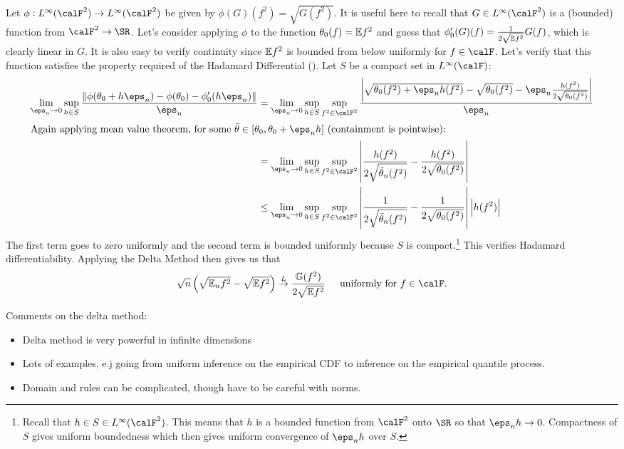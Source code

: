 \begin{example}
	Let \(\phi:L^\infty(\calF^2)\to L^\infty(\calF^2)\) be given by \(\phi(G)(f^2) = \sqrt{G(f^2)}\). It is useful here to recall that \(G \in L^\infty(\calF^2)\) is a (bounded) function from  \(\calF^2\to\SR\). Let's consider applying \(\phi\) to the function  \(\theta_0(f)=\mathbb{E} f^2\) and guess that \(\phi_0'(G)(f) = \frac{1}{2\sqrt{\mathbb{E} f^2}}G(f)\), which is clearly linear in \(G\). It is also easy to verify continuity since \(\mathbb{E} f^2\) is bounded from below uniformly for \(f\in\calF\). Let's verify that this function satisfies the property required of the Hadamard Differential (). Let \(S\) be a compact set in  \(L^\infty(\calF)\):
	\begin{align*}
		\lim_{\eps_n\to 0}\sup_{h \in S}\frac{\|\phi(\theta_0+h\eps_n)-\phi(\theta_0)-\phi_0'(h\eps_n)\|}{\eps_n} 
		&= \lim_{\eps_n\to 0}\sup_{h\in S} \sup_{f^2\in\calF^2}\frac{ \left|\sqrt{\theta_0(f^2)+\eps_nh(f^2)}-\sqrt{\theta_0(f^2)} - \eps_n\frac{h(f^2)}{2\sqrt{\theta_0(f^2)}} \right|}{\eps_n} \\
		\intertext{Again applying mean value theorem, for some \(\bar\theta \in [\theta_0, \theta_0+\eps_n h]\) (containment is pointwise):} 
		&= \lim_{\eps_n\to0}\sup_{h\in S}\sup_{f^2 \in \calF^2} \left|\frac{h(f^2)}{2\sqrt{\bar\theta_n(f^2)}} - \frac{h(f^2)}{2\sqrt{\theta_0(f^2)}}  \right| \\
		&\leq \lim_{\eps_n\to 0}\sup_{h\in S}\sup_{f^2\in\calF^2}\left|\frac{1}{2\sqrt{\bar\theta_n(f^2)}}-\frac{1}{2\sqrt{\theta_0(f^2)}}\right|\left|h(f^2)\right|
	\end{align*}
	The first term goes to zero uniformly and the second term is bounded uniformly because \(S\) is compact.\footnote{Recall that \(h \in S \in L^\infty(\calF^2)\). This means that \(h\) is a bounded function from \(\calF^2\) onto \(\SR\) so that \(\eps_n h \to 0\). Compactness of \(S\) gives uniform boundedness which then gives uniform convergence of \(\eps_n h\) over \(S\).} This verifies Hadamard differentiability. Applying the Delta Method then gives us that 
	\[
		\sqrt{n}\left(\sqrt{\E_n f^2}-\sqrt{\E f^2}\right)\overset{L}{\to} \frac{\mathbb{G}(f^2)}{2\sqrt{\E f^2}}\;\;\;\;\text{ uniformly for \(f\in\calF\)}
	.\]
\end{example}
\begin{remark*} Comments on the delta method:
	\begin{itemize}
		\item Delta method is very powerful in infinite dimensions
		\item Lots of examples, e.j going from uniform inference on the empirical CDF to inference on the empirical quantile process.
		\item Domain and rules can be complicated, though have to be careful with norms.
	\end{itemize}
\end{remark*}

